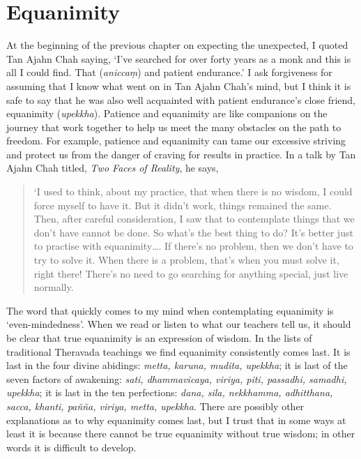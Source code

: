 \section{Equanimity}

At the beginning of the previous chapter on expecting the unexpected, I
quoted Tan Ajahn Chah saying, `I've searched for over forty years as a
monk and this is all I could find. That (\emph{aniccaṃ}) and patient
endurance.' I ask forgiveness for assuming that I know what went on in
Tan Ajahn Chah's mind, but I think it is safe to say that he was also
well acquainted with patient endurance's close friend, equanimity
(\emph{upekkha}). Patience and equanimity are like companions on the
journey that work together to help us meet the many obstacles on the
path to freedom. For example, patience and equanimity can tame our
excessive striving and protect us from the danger of craving for results
in practice. In a talk by Tan Ajahn Chah titled, \emph{Two Faces of
Reality}, he says,

\begin{quotation}
`I used to think, about my practice, that when there is no wisdom, I
could force myself to have it. But it didn't work, things remained the
same. Then, after careful consideration, I saw that to contemplate
things that we don't have cannot be done. So what's the best thing to
do? It's better just to practise with equanimity\ldots. If there's no
problem, then we don't have to try to solve it. When there is a problem,
that's when you must solve it, right there! There's no need to go
searching for anything special, just live normally.

\end{quotation}

The word that quickly comes to my mind when contemplating equanimity is
`even-mindedness'. When we read or listen to what our teachers tell us,
it should be clear that true equanimity is an expression of wisdom. In
the lists of traditional Theravada teachings we find equanimity
consistently comes last. It is last in the four divine abidings:
\emph{metta, karuna, mudita, upekkha}; it is last of the seven factors
of awakening: \emph{sati, dhammavicaya, viriya, piti, passadhi, samadhi,
upekkha}; it is last in the ten perfections: \emph{dana, sila,
nekkhamma, adhitthana, sacca, khanti, pañña, viriya, metta, upekkha}.
There are possibly other explanations as to why equanimity comes last,
but I trust that in some ways at least it is because there cannot be
true equanimity without true wisdom; in other words it is difficult to
develop.

